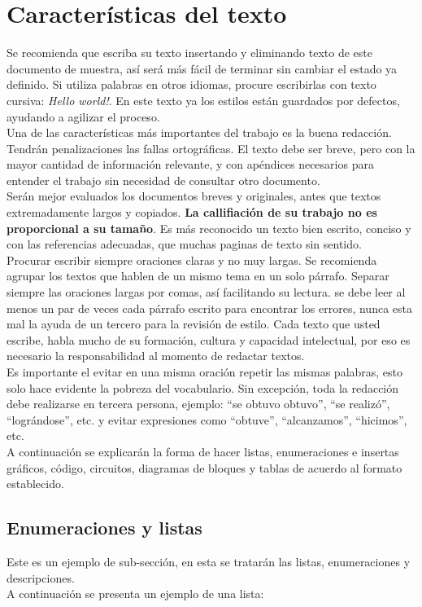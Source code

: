 \documentclass[
10pt,			%
letterpaper,	%
oneside,		%
headinclude, footinclude, %
BCOR5mm, 		%
]{scrartcl}
\begin{document}
\section{Características del texto} %
Se recomienda que escriba su texto insertando y eliminando texto de este documento de muestra, así será más fácil de terminar sin cambiar el estado ya definido. Si utiliza palabras en otros idiomas, procure escribirlas con texto cursiva: \textit{Hello world!}. En este texto ya los estilos están guardados por defectos, ayudando a agilizar el proceso.\\
Una de las características más importantes del trabajo es la buena redacción. Tendrán penalizaciones las fallas ortográficas. El texto debe ser breve, pero con la mayor cantidad de información relevante, y con apéndices necesarios para entender el trabajo sin necesidad de consultar otro documento.\\
Serán mejor evaluados los documentos breves y originales, antes que textos extremadamente largos y copiados. \textbf{La callifiación de su trabajo no es proporcional a su tamaño}. Es más reconocido un texto bien escrito, conciso y con las referencias adecuadas, que muchas paginas de texto sin sentido.\\
Procurar escribir siempre oraciones claras y no muy largas. Se recomienda agrupar los textos que hablen de un mismo tema en un solo párrafo. Separar siempre las oraciones largas por comas, así facilitando su lectura. se debe leer al menos un par de veces cada párrafo escrito para encontrar los errores, nunca esta mal la ayuda de un tercero para la revisión de estilo. Cada texto que usted escribe, habla mucho de su formación, cultura y capacidad intelectual, por eso es necesario la responsabilidad al momento de redactar textos.\\
Es importante el evitar en una misma oración repetir las mismas palabras, esto solo hace evidente la pobreza del vocabulario. Sin excepción, toda la redacción debe realizarse en tercera persona, ejemplo: “se obtuvo obtuvo”, “se realizó”, “lográndose”, etc. y evitar expresiones como “obtuve”, “alcanzamos”, “hicimos”, etc.\\
A continuación se explicarán la forma de hacer listas, enumeraciones e insertas gráficos, código, circuitos, diagramas de bloques y tablas de acuerdo al formato establecido.

\subsection{Enumeraciones y listas}
Este es un ejemplo de sub-sección, en esta se tratarán las listas, enumeraciones y  descripciones.\\
A continuación se presenta un ejemplo de una lista:
\end{document}

